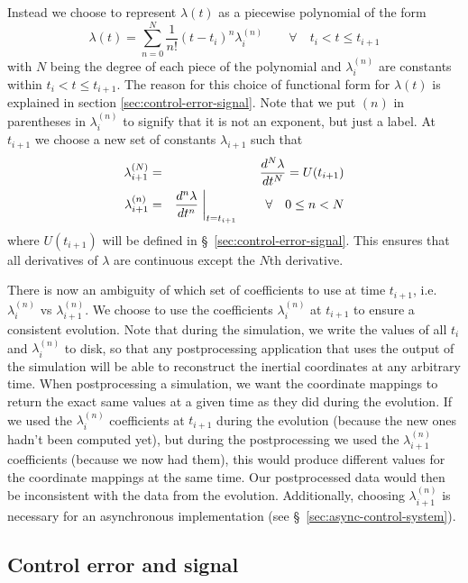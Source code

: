 \begin{bibunit}[unsrtnat]
Instead we choose to represent $\lambda(t)$
as a piecewise polynomial of the form
\begin{equation}
  \label{eq:lambda}
  \lambda(t) = \sum_{n=0}^{N}\frac{1}{n!}(t-t_{i})^n\lambda_{i}^{(n)}
    \quad\quad\forall\quad t_{i} < t \leq t_{i+1}
\end{equation}
with $N$ being the degree of each piece of the polynomial and
$\lambda_{i}^{(n)}$ are constants within $t_{i} < t \leq t_{i+1}$. The reason
for this choice of functional form for $\lambda(t)$ is explained in section
\ref{sec:control-error-signal}. Note that we put $(n)$ in parentheses in
$\lambda_{i}^{(n)}$ to signify that it is not an exponent, but just a label. At
$t_{i+1}$ we choose a new set of constants $\lambda_{i+1}$ such that
\begin{eqnarray}
  \label{eq:lambda-i-N}
  \lambda_{i+1}^{(N)} &=& \frac{d^{N}\lambda}{dt^{N}} = U(t_{i+1}) \\
  \label{eq:lambda-i-n}
  \lambda_{i+1}^{(n)} &=&
    \frac{d^{n}\lambda}{dt^{n}}\biggm|_{t=t_{i+1}}\quad\quad\forall\quad0 \leq n
    < N
\end{eqnarray}
where $U(t_{i+1})$ will be defined in \S~\ref{sec:control-error-signal}.
This ensures that all derivatives of $\lambda$ are continuous except the $N$th
derivative.

There is now an ambiguity of which set of coefficients to use at time $t_{i+1}$,
i.e.~$\lambda_i^{(n)}$ vs $\lambda_{i+1}^{(n)}$. We choose to use the
coefficients $\lambda_i^{(n)}$ at $t_{i+1}$ to ensure a consistent evolution.
Note that during the simulation, we write the values of all $t_{i}$ and
$\lambda_i^{(n)}$ to disk, so that any postprocessing application that uses the
output of the simulation will be able to reconstruct the inertial coordinates at
any arbitrary time. When postprocessing a simulation, we want the coordinate
mappings to return the exact same values at a given time as they did during the
evolution. If we used the $\lambda_i^{(n)}$ coefficients at $t_{i+1}$ during the
evolution (because the new ones hadn't been computed yet), but during the
postprocessing we used the $\lambda_{i+1}^{(n)}$ coefficients (because we now
had them), this would produce different values for the coordinate mappings at
the same time. Our postprocessed data would then be inconsistent with the data
from the evolution. Additionally, choosing $\lambda_{i+1}^{(n)}$ is necessary
for an asynchronous implementation (see \S~\ref{sec:async-control-system}).

\subsection{Control error and signal\label{sec:control-error-signal}}


\end{bibunit}
